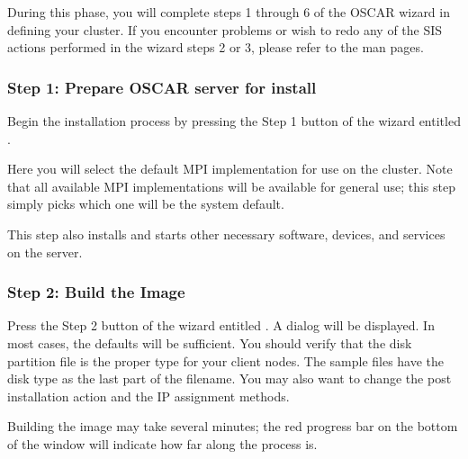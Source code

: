 During this phase, you will complete steps 1 through 6 of the OSCAR
wizard in defining your cluster.  If you encounter problems or wish to
redo any of the SIS actions performed in the wizard steps 2 or 3,
please refer to the  man pages.


\subsubsection{Step 1: Prepare OSCAR server for install} 
\label{det:prepareforinstall}

Begin the installation process by pressing the Step 1 button of the
wizard entitled . 

Here you will select the default MPI implementation for use on the
cluster.  Note that all available MPI implementations will be
available for general use; this step simply picks which one will be
the system default.

This step also installs and starts other necessary software, devices,
and services on the server.


\subsubsection{Step 2: Build the Image} 
\label{det:buildimage}

Press the Step 2 button of the wizard entitled . A dialog will be displayed. In most cases, the
defaults will be sufficient. You should verify that the disk partition
file is the proper type for your client nodes. The sample files have
the disk type as the last part of the filename. You may also want to
change the post installation action and the IP assignment methods.

Building the image may take several minutes; the red progress bar on
the bottom of the window will indicate how far along the process is.

